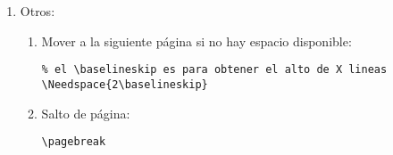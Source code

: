 \begin{enumerate}
\item Otros:
\begin{enumerate}
	\item Mover a la siguiente página si no hay espacio disponible:
	\begin{lstlisting}
% el \baselineskip es para obtener el alto de X lineas
\Needspace{2\baselineskip}
	\end{lstlisting}
	
	\item Salto de página:
	\begin{lstlisting}
\pagebreak
	\end{lstlisting}	
\end{enumerate}

\end{enumerate}